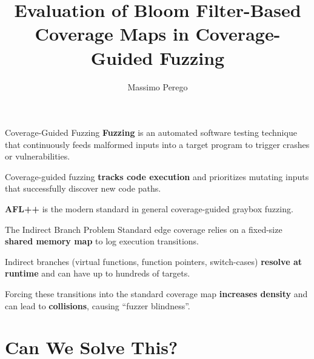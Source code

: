 \documentclass[aspectratio=169]{beamer}
\title{Evaluation of Bloom Filter-Based Coverage Maps in Coverage-Guided Fuzzing}
\date{}
\author{Massimo Perego}
\institute{Supervisor: Andrea Lanzi \\ \\ Università degli Studi di Milano}
\begin{document}
  \maketitle


  \begin{frame}{Coverage-Guided Fuzzing}
    \textbf{Fuzzing} is an automated software testing technique that continuously feeds malformed inputs into a target program to trigger crashes or vulnerabilities.

    Coverage-guided fuzzing \textbf{tracks code execution} and prioritizes mutating inputs that successfully discover new code paths.

    \begin{center}
        
    \end{center}

    \textbf{AFL++} is the modern standard in general coverage-guided graybox fuzzing.
  \end{frame}


  \begin{frame}{The Indirect Branch Problem}
    Standard edge coverage relies on a fixed-size \textbf{shared memory map} to log execution transitions. %
  
    Indirect branches (virtual functions, function pointers, switch-cases) \textbf{resolve at runtime} and can have up to hundreds of targets.

    \begin{center}
        
    \end{center}

    \vspace*{-0.2cm}
    Forcing these transitions into the standard coverage map \textbf{increases density} and can lead to \textbf{collisions}, causing ``fuzzer blindness''.
  \end{frame}

  \section{Can We Solve This?}
  
\end{document}
